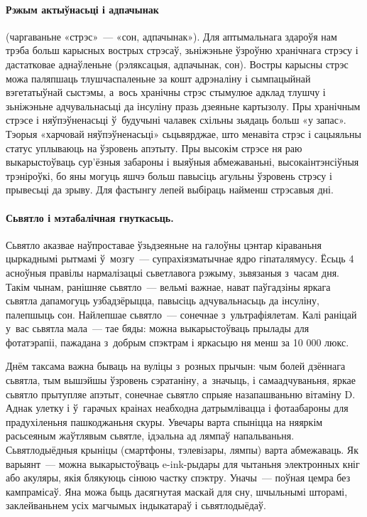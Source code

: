 \paragraph{Рэжым актыўнасьці і адпачынак} (чаргаваньне «стрэс»~--- «сон, адпачынак»).
Для аптымальнага здароўя нам трэба больш карысных вострых стрэсаў, зьніжэньне ўзроўню хранічнага стрэсу і дастатковае аднаўленьне (рэляксацыя, адпачынак, сон). Востры карысны стрэс можа паляпшаць тлушчаспаленьне за кошт адрэналіну і сымпацыйнай вэгетатыўнай сыстэмы, а~вось хранічны стрэс стымулюе адклад тлушчу і зьніжэньне адчувальнасьці да інсуліну празь дзеяньне картызолу. Пры хранічным стрэсе і няўпэўненасьці ў~будучыні чалавек схільны зьядаць больш «у запас». Тэорыя «харчовай няўпэўненасьці» сьцьвярджае, што менавіта стрэс і сацыяльны статус уплываюць на ўзровень апэтыту. Пры высокім стрэсе ня раю выкарыстоўваць сур'ёзныя забароны і выяўныя абмежаваньні, высокаінтэнсіўныя трэніроўкі, бо яны могуць яшчэ больш павысіць агульны ўзровень стрэсу і прывесьці да зрыву. Для фастынгу лепей выбіраць найменш стрэсавыя дні.

\paragraph{Сьвятло і мэтабалічная гнуткасьць.}
Сьвятло аказвае наўпроставае ўзьдзеяньне на галоўны цэнтар кіраваньня цыркаднымі рытмамі ў~мозгу~--- супрахіязматычнае ядро гіпаталямусу. Ёсьць 4 асноўныя правілы нармалізацыі сьветлавога рэжыму, зьвязаныя з~часам дня. Такім чынам, ранішняе сьвятло~--- вельмі важнае, нават паўгадзіны яркага сьвятла дапамогуць узбадзёрыцца, павысіць адчувальнасьць да інсуліну, палепшыць сон. Найлепшае сьвятло~--- сонечнае з~ультрафіялетам. Калі раніцай у~вас сьвятла мала~--- тае бяды: можна выкарыстоўваць прылады для фотатэрапіі, пажадана з~добрым спэктрам і яркасьцю ня менш за 10 000 люкс.

Днём таксама важна бываць на вуліцы з~розных прычын: чым болей дзённага сьвятла, тым вышэйшы ўзровень сэратаніну, а~значыць, і самаадчуваньня, яркае сьвятло прытупляе апэтыт, сонечнае сьвятло спрыяе назапашваньню вітаміну D. Аднак улетку і ў~гарачых краінах неабходна датрымлівацца і фотаабароны для прадухіленьня пашкоджаньня скуры. Увечары варта спыніцца на няяркім расьсеяным жаўтлявым сьвятле, ідэальна ад лямпаў напальваньня. Сьвятлодыёдныя крыніцы (смартфоны, тэлевізары, лямпы) варта абмежаваць. Як варыянт~--- можна выкарыстоўваць e-ink-рыдары для чытаньня электронных кніг або акуляры, якія блякуюць сінюю частку спэктру. Уначы~--- поўная цемра без кампрамісаў. Яна можа быць дасягнутая маскай для сну, шчыльнымі шторамі, заклейваньнем усіх магчымых індыкатараў і сьвятлодыёдаў.


